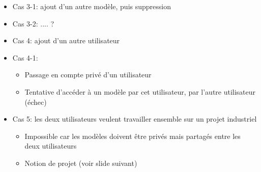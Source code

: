 \documentclass[t, english]{beamer}
\begin{document}
\begin{frame}[t,fragile]
{\begin{itemize}
      \begin{itemize}
        \item Chaque utilisateur dispose de ressources: formalismes,
          modèles, services et exécutions
        \item Lui seul peut créer ou modifier une ressource
      \end{itemize}
    \item Cas 3-1: ajout d'un autre modèle, puis suppression
    \item Cas 3-2: .... ?
    \item Cas 4: ajout d'un autre utilisateur
    \item Cas 4-1:
      \begin{itemize}
        \item Passage en compte privé d'un utilisateur
        \item Tentative d'accéder à un modèle par cet utilisateur,
          par l'autre utilisateur (échec)
      \end{itemize}
    \item Cas 5: les deux utilisateurs veulent travailler ensemble sur un
      projet industriel
      \begin{itemize}
        \item Impossible car les modèles doivent être privés mais partagés
          entre les deux utilisateurs
        \item Notion de projet (voir slide suivant)
      \end{itemize}
  \end{itemize}
}
\end{frame}
\end{document}
